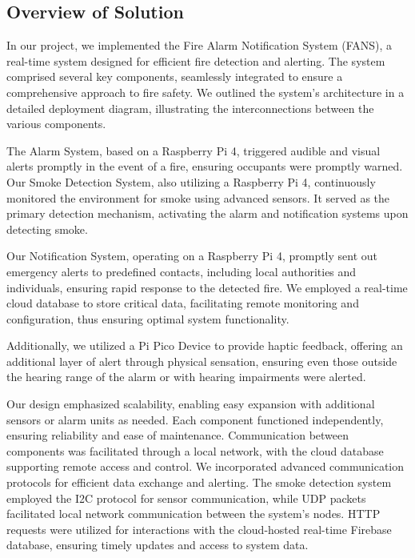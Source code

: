 \subsection{Overview of Solution}

In our project, we implemented the Fire Alarm Notification System (FANS), a real-time system designed for efficient
fire detection and alerting. The system comprised several key components, seamlessly integrated to ensure a
comprehensive approach to fire safety. We outlined the system's architecture in a detailed deployment diagram,
illustrating the interconnections between the various components.

The Alarm System, based on a Raspberry Pi 4, triggered audible and visual alerts promptly in the event of a fire,
ensuring occupants were promptly warned. Our Smoke Detection System, also utilizing a Raspberry Pi 4, continuously
monitored the environment for smoke using advanced sensors. It served as the primary detection mechanism, activating
the alarm and notification systems upon detecting smoke.

Our Notification System, operating on a Raspberry Pi 4, promptly sent out emergency alerts to predefined contacts,
including local authorities and individuals, ensuring rapid response to the detected fire. We employed a real-time
cloud database to store critical data, facilitating remote monitoring and configuration, thus ensuring optimal system
functionality.

Additionally, we utilized a Pi Pico Device to provide haptic feedback, offering an additional layer of alert through
physical sensation, ensuring even those outside the hearing range of the alarm or with hearing impairments were
alerted.

Our design emphasized scalability, enabling easy expansion with additional sensors or alarm units as needed. Each
component functioned independently, ensuring reliability and ease of maintenance. Communication between components was
facilitated through a local network, with the cloud database supporting remote access and control. We incorporated
advanced communication protocols for efficient data exchange and alerting. The smoke detection system employed the I2C
protocol for sensor communication, while UDP packets facilitated local network communication between the system's
nodes. HTTP requests were utilized for interactions with the cloud-hosted real-time Firebase database, ensuring timely
updates and access to system data.

